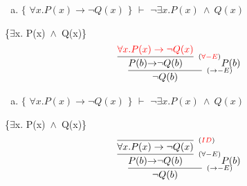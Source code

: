 \documentclass[aspectratio=43]{beamer}
\newcommand{\ria}{$\rightarrow$}
\newcommand{\ex}{$\exists$}
\newcommand{\nao}{$\neg$}
\newcommand{\andd}{$\wedge$}
\begin{document}
    \begin{frame}[fragile]
    	
    	\begin{enumerate}[b)]
			
			\item $\{$ $\forall x.P(x)\to \neg Q(x)$ $\}$ $\vdash$ $ \neg\exists  x.P(x)\ \wedge\ Q(x)$ \\ 
			
		\end{enumerate}
        \{\ex  x. P(x)\ \andd\ Q(x)\}
        \vspace{90pt}
        \[
        \begin{array}{c}
		
        	\infer[_{(\to-E)}]
            {$\nao$ Q(b)}
            {\infer[_{(\textcolor{red}{\forall-E})}] 
            	{P(b) $\ria$ $\nao$ Q(b)}
               	{\textcolor{red}{\forall x.P(x)\rightarrow \neg Q(x)}} 
            P(b)
            }
		\end{array}
        \]
        
	\end{frame}
    
    \begin{frame}[fragile]
    	
    	\begin{enumerate}[b)]
			
			\item $\{$ $\forall x.P(x)\to \neg Q(x)$ $\}$ $\vdash$ $ \neg\exists  x.P(x)\ \wedge\ Q(x)$ \\ 
			
		\end{enumerate}
        \{\ex  x. P(x)\ \andd\ Q(x)\}
        \vspace{90pt}
        \[
        \begin{array}{c}
		
        	\infer[_{(\to-E)}]
            {$\nao$ Q(b)}
            {\infer[_{(\forall-E)}] 
            	{P(b) $\ria$ $\nao$ Q(b)}
               	{\infer[_{(\textcolor{red}{ID})}]
                	{\forall x.P(x)\to \neg Q(x)}
                    {}
                }
            P(b)
            }
		\end{array}
        \]
        
	\end{frame}
    
\end{document}
